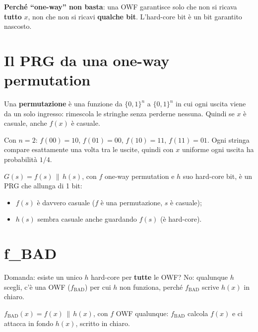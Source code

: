 \textbf{Perché ``one-way'' non basta}: una OWF garantisce solo che non si ricava \textbf{tutto} \(x\), non che non si ricavi \textbf{qualche bit}. L'hard-core bit è un bit garantito nascosto.

\section{Il PRG da una one-way permutation}

\begin{inbreve}
Una \textbf{permutazione} è una funzione da \(\{0,1\}^n\) a \(\{0,1\}^n\) in cui ogni uscita viene da un solo ingresso: rimescola le stringhe senza perderne nessuna. Quindi se \(x\) è casuale, anche \(f(x)\) è casuale.
\end{inbreve}

\begin{esempio}
Con \(n = 2\): \(f(00) = 10\), \(f(01) = 00\), \(f(10) = 11\), \(f(11) = 01\). Ogni stringa compare esattamente una volta tra le uscite, quindi con \(x\) uniforme ogni uscita ha probabilità \(1/4\).
\end{esempio}

\(G(s) = f(s) \,\|\, h(s)\), con \(f\) one-way permutation e \(h\) suo hard-core bit, è un PRG che allunga di 1 bit:
\begin{itemize}
  \item \(f(s)\) è davvero casuale (\(f\) è una permutazione, \(s\) è casuale);
  \item \(h(s)\) sembra casuale anche guardando \(f(s)\) (è hard-core).
\end{itemize}

\section{f\_BAD}

\begin{inbreve}
Domanda: esiste un unico \(h\) hard-core per \textbf{tutte} le OWF? No: qualunque \(h\) scegli, c'è una OWF (\(f_{\text{BAD}}\)) per cui \(h\) non funziona, perché \(f_{\text{BAD}}\) scrive \(h(x)\) in chiaro.
\end{inbreve}

\(f_{\text{BAD}}(x) = f(x) \,\|\, h(x)\), con \(f\) OWF qualunque: \(f_{\text{BAD}}\) calcola \(f(x)\) e ci attacca in fondo \(h(x)\), scritto in chiaro.

